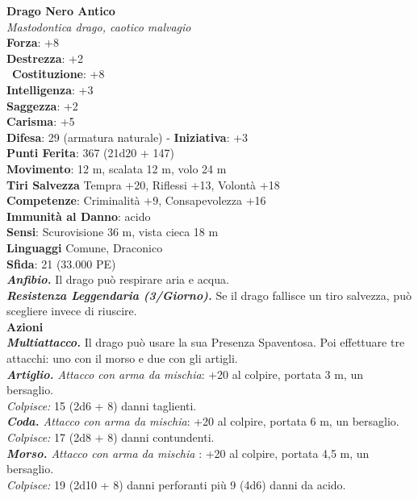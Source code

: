 \begin{multicols}{2}
\medskip\textbf{Drago Nero Antico}\\
\emph{Mastodontica drago, caotico malvagio}\\
\textbf{Forza}: +8\\
\textbf{Destrezza}: +2\\\
\textbf{Costituzione}: +8\\
\textbf{Intelligenza}: +3\\
\textbf{Saggezza}: +2\\
\textbf{Carisma}: +5\\
\textbf{Difesa}: 29 (armatura naturale) - \textbf{Iniziativa}: +3\\
\textbf{Punti Ferita}: 367 (21d20 + 147)\\
\textbf{Movimento}: 12 m, scalata 12 m, volo 24 m\\
\textbf{Tiri Salvezza} Tempra +20, Riflessi +13, Volontà +18\\
\textbf{Competenze}: Criminalità +9, Consapevolezza +16\\
\textbf{Immunità al Danno}: acido\\
\textbf{Sensi}: Scurovisione 36 m, vista cieca 18 m\\
\textbf{Linguaggi} Comune, Draconico\\
\textbf{Sfida}: 21 (33.000 PE)\smallskip\\
\emph{\textbf{Anfibio.}} Il drago può respirare aria e acqua.\\
\emph{\textbf{Resistenza Leggendaria (3/Giorno).}} Se il drago fallisce un tiro salvezza, può scegliere invece di riuscire.\\
\smallskip\textbf{Azioni}\\
\emph{\textbf{Multiattacco.}} Il drago può usare la sua Presenza Spaventosa. Poi effettuare tre attacchi: uno con il morso e due con gli artigli.\\
\emph{\textbf{Artiglio.} Attacco con arma da mischia}: +20 al colpire, portata 3 m, un bersaglio.\\
\emph{Colpisce:} 15 (2d6 + 8) danni taglienti.\\
\emph{\textbf{Coda.} Attacco con arma da mischia}: +20 al colpire, portata 6 m, un bersaglio.\\
\emph{Colpisce:} 17 (2d8 + 8) danni contundenti.\\
\emph{\textbf{Morso.} Attacco con arma da mischia} : +20 al colpire, portata 4,5 m, un bersaglio.\\
\emph{Colpisce:} 19 (2d10 + 8) danni perforanti più 9 (4d6) danni da acido.\\

\end{multicols}
